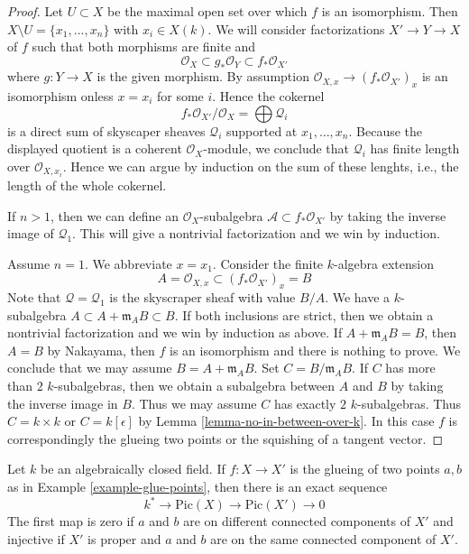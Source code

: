 \begin{proof}
Let $U \subset X$ be the maximal open set over which $f$ is an isomorphism.
Then $X \setminus U = \{x_1, \ldots, x_n\}$ with $x_i \in X(k)$.
We will consider factorizations $X' \to Y \to X$ of $f$ such that
both morphisms are finite and
$$
\mathcal{O}_X \subset g_*\mathcal{O}_Y \subset f_*\mathcal{O}_{X'}
$$
where $g : Y \to X$ is the given morphism. By assumption
$\mathcal{O}_{X, x} \to (f_*\mathcal{O}_{X'})_x$ is an isomorphism
onless $x = x_i$ for some $i$. Hence the cokernel
$$
f_*\mathcal{O}_{X'}/\mathcal{O}_X = \bigoplus \mathcal{Q}_i
$$
is a direct sum of skyscaper sheaves $\mathcal{Q}_i$ supported at
$x_1, \ldots, x_n$.
Because the displayed quotient is a coherent $\mathcal{O}_X$-module,
we conclude that $\mathcal{Q}_i$ has finite length over
$\mathcal{O}_{X, x_i}$. Hence we can argue
by induction on the sum of these lenghts, i.e., the length of
the whole cokernel.

\medskip\noindent
If $n > 1$, then we can define an $\mathcal{O}_X$-subalgebra
$\mathcal{A} \subset f_*\mathcal{O}_{X'}$ by taking the inverse
image of $\mathcal{Q}_1$. This will give a nontrivial factorization
and we win by induction.

\medskip\noindent
Assume $n = 1$. We abbreviate $x = x_1$. Consider the finite
$k$-algebra extension
$$
A = \mathcal{O}_{X, x} \subset (f_*\mathcal{O}_{X'})_x = B
$$
Note that $\mathcal{Q} = \mathcal{Q}_1$ is the skyscraper sheaf
with value $B/A$.
We have a $k$-subalgebra $A \subset A + \mathfrak m_A B \subset B$.
If both inclusions are strict, then we obtain a nontrivial
factorization and we win by induction as above.
If $A + \mathfrak m_A B = B$, then $A = B$ by Nakayama, then
$f$ is an isomorphism and there is nothing to prove.
We conclude that we may assume $B = A + \mathfrak m_A B$.
Set $C = B/\mathfrak m_A B$. If $C$ has more than $2$
$k$-subalgebras, then we obtain a subalgebra between $A$
and $B$ by taking the inverse image in $B$. Thus we may
assume $C$ has exactly $2$ $k$-subalgebras. Thus $C = k \times k$
or $C = k[\epsilon]$ by Lemma \ref{lemma-no-in-between-over-k}.
In this case $f$ is correspondingly the glueing two points or the
squishing of a tangent vector.
\end{proof}

\begin{lemma}
\label{lemma-glue-points}
Let $k$ be an algebraically closed field. If $f : X \to X'$ is the
glueing of two points $a, b$ as in Example \ref{example-glue-points}, then
there is an exact sequence
$$
k^* \to \text{Pic}(X) \to \text{Pic}(X') \to 0
$$
The first map is zero if $a$ and $b$ are on different
connected components of $X'$ and injective
if $X'$ is proper and $a$ and $b$ are on the same connected component of $X'$.
\end{lemma}

